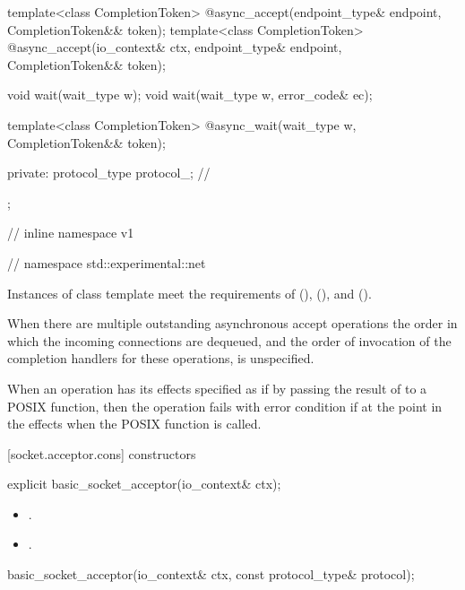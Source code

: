 \begin{codeblock}
{{{    template<class CompletionToken>
      @\DEDUCED@ async_accept(endpoint_type& endpoint,
                           CompletionToken&& token);
    template<class CompletionToken>
      @\DEDUCED@ async_accept(io_context& ctx, endpoint_type& endpoint,
                           CompletionToken&& token);

    void wait(wait_type w);
    void wait(wait_type w, error_code& ec);

    template<class CompletionToken>
      @\DEDUCED@ async_wait(wait_type w, CompletionToken&& token);

  private:
    protocol_type protocol_; // \expos
  };

} // inline namespace v1
} // namespace std::experimental::net
\end{codeblock}

\pnum
Instances of class template  meet the requirements of  (),  (), and  ().

\pnum
 When there are multiple outstanding asynchronous accept operations the order in which the incoming connections are dequeued, and the order of invocation of the completion handlers for these operations, is unspecified.

\pnum
When an operation has its effects specified as if by passing the result of  to a POSIX function, then the operation fails with error condition  if  at the point in the effects when the POSIX function is called.


[socket.acceptor.cons]{ constructors}

\begin{itemdecl}
explicit basic_socket_acceptor(io_context& ctx);
\end{itemdecl}

\begin{itemdescr}
\pnum
\postconditions
\begin{itemize}
\item
{}.
\item
{}.
\end{itemize}
\end{itemdescr}

\begin{itemdecl}
basic_socket_acceptor(io_context& ctx, const protocol_type& protocol);
\end{itemdecl}

